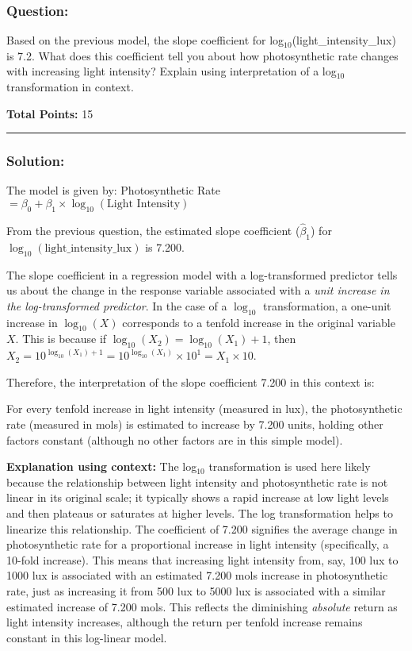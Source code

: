\documentclass[
  letterpaper,
  DIV=11,
  numbers=noendperiod]{scrartcl}
\begin{document}
\subsubsection{Question:}\label{question-2}

Based on the previous model, the slope coefficient for
log\(_{10}\)(light\_intensity\_lux) is 7.2. What does this coefficient
tell you about how photosynthetic rate changes with increasing light
intensity? Explain using interpretation of a log\(_{10}\) transformation
in context.

\textbf{Total Points:} 15

\begin{center}\rule{0.5\linewidth}{0.5pt}\end{center}

\subsubsection{Solution:}\label{solution-2}

The model is given by: Photosynthetic Rate
\(= \beta_0 + \beta_1 \times \log_{10}(\text{Light Intensity})\)

From the previous question, the estimated slope coefficient
(\(\hat{\beta}_1\)) for \(\log_{10}(\text{light\_intensity\_lux})\) is
7.200.

The slope coefficient in a regression model with a log-transformed
predictor tells us about the change in the response variable associated
with a \emph{unit increase in the log-transformed predictor}. In the
case of a \(\log_{10}\) transformation, a one-unit increase in
\(\log_{10}(X)\) corresponds to a tenfold increase in the original
variable \(X\). This is because if
\(\log_{10}(X_2) = \log_{10}(X_1) + 1\), then
\(X_2 = 10^{\log_{10}(X_1) + 1} = 10^{\log_{10}(X_1)} \times 10^1 = X_1 \times 10\).

Therefore, the interpretation of the slope coefficient 7.200 in this
context is:

For every tenfold increase in light intensity (measured in lux), the
photosynthetic rate (measured in mols) is estimated to increase by 7.200
units, holding other factors constant (although no other factors are in
this simple model).

\textbf{Explanation using context:} The log\(_{10}\) transformation is
used here likely because the relationship between light intensity and
photosynthetic rate is not linear in its original scale; it typically
shows a rapid increase at low light levels and then plateaus or
saturates at higher levels. The log transformation helps to linearize
this relationship. The coefficient of 7.200 signifies the average change
in photosynthetic rate for a proportional increase in light intensity
(specifically, a 10-fold increase). This means that increasing light
intensity from, say, 100 lux to 1000 lux is associated with an estimated
7.200 mols increase in photosynthetic rate, just as increasing it from
500 lux to 5000 lux is associated with a similar estimated increase of
7.200 mols. This reflects the diminishing \emph{absolute} return as
light intensity increases, although the return per tenfold increase
remains constant in this log-linear model.
\end{document}
